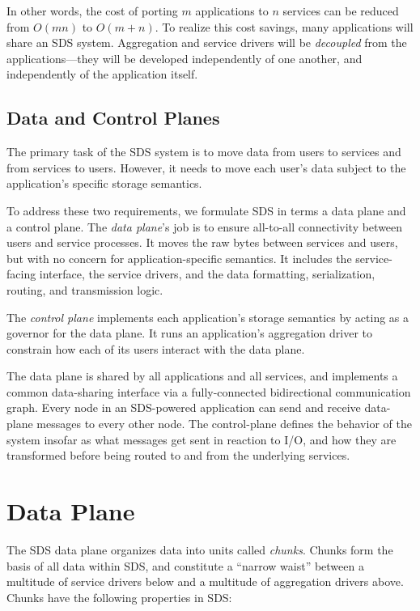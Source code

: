 In other words, the cost of porting $m$ applications to $n$ services can be
reduced from $O(mn)$ to $O(m+n)$.
To realize this cost savings, many applications will share an SDS system.  Aggregation and service drivers
will be \emph{decoupled} from the applications---they will be
developed independently of one another, and independently of the
application itself.

\subsection{Data and Control Planes}

The primary task of the SDS system is to move data from users to services and from
services to users.  However, it needs to move each user's data
subject to the application's specific storage semantics.

To address these two requirements, we formulate SDS in terms a
data plane and a control plane.  The \emph{data plane}'s job
is to ensure all-to-all connectivity between users and service processes.
It moves the raw bytes between services and users, but with no concern for
application-specific semantics.  It includes the service-facing interface, the
service drivers, and the data formatting, serialization, routing, and transmission
logic.

The \emph{control plane} implements each application's
storage semantics by acting as a governor for the data plane.
It runs an application's aggregation driver 
to constrain how each of its users interact with the data plane.

The data plane is shared by all applications and all services, and implements a
common data-sharing interface via a fully-connected bidirectional communication graph.
Every node in an SDS-powered application can send and receive data-plane
messages to every other node.  The control-plane defines the behavior of the
system insofar as what messages get sent in reaction to I/O, and how they are
transformed before being routed to and from the underlying services.

\section{Data Plane}

The SDS data plane organizes data into units called \emph{chunks}.  Chunks form
the basis of all data within SDS, and constitute a ``narrow waist'' between 
a multitude of service drivers below and a multitude of aggregation drivers
above.  Chunks have the following properties in SDS:

